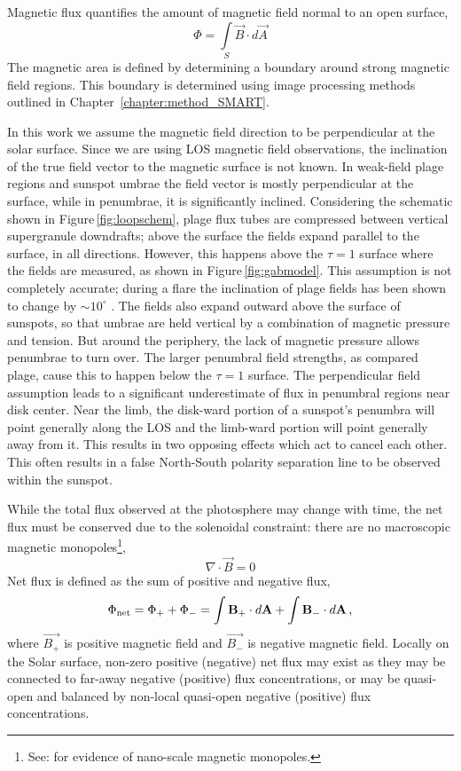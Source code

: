 Magnetic flux quantifies the amount of magnetic field normal to an open surface,
\begin{equation}
\Phi = \int\limits_S \vec{B} \cdot d\vec{A}  
\end{equation}
The magnetic area is defined by determining a boundary around strong magnetic field regions. This boundary is determined using image processing methods outlined in Chapter~\ref{chapter:method_SMART}.

In this work we assume the magnetic field direction to be perpendicular at the solar surface. Since we are using \gls{LOS} magnetic field observations, the inclination of the true field vector to the magnetic surface is not known. In weak-field plage regions and sunspot umbrae the field vector is mostly perpendicular at the surface, while in penumbrae, it is significantly inclined. Considering the schematic shown in Figure\,\ref{fig:loopschem}, plage flux tubes are compressed between vertical supergranule downdrafts; above the surface the fields expand parallel to the surface, in all directions. However, this happens above the $\tau=1$ surface where the fields are measured, as shown in Figure\,\ref{fig:gabmodel}. This assumption is not completely accurate; during a flare the inclination of plage fields has been shown to change by $\sim$$10^{\circ}$ \citep{Murray:2012}. The fields also expand outward above the surface of sunspots, so that umbrae are held vertical by a combination of magnetic pressure and tension. But around the periphery, the lack of magnetic pressure allows penumbrae to turn over. The larger penumbral field strengths, as compared plage, cause this to happen below the $\tau=1$ surface. The perpendicular field assumption leads to a significant underestimate of flux in penumbral regions near disk center. Near the limb,  the disk-ward portion of a sunspot's penumbra will point generally along the LOS and the limb-ward portion will point generally away from it. This results in two opposing effects which act to cancel each other. This often results in a false North-South polarity separation line to be observed within the sunspot.

While the total flux observed at the photosphere may change with time, the net flux must be conserved due to the solenoidal constraint: there are no macroscopic magnetic monopoles\footnote{See: \citet{Mengotti:2010} for evidence of nano-scale magnetic monopoles.},
\begin{equation}\label{eqn_gauss_law}
\nabla\cdot\vec{B}=0  
\end{equation}
Net flux is defined as the sum of positive and negative flux,
\begin{equation}
\Phi_{\mathrm{net}}=\Phi_{+}+\Phi_{-}=\int{\vec{B_{+}}\cdot d\vec{A}} + \int{\vec{B_{-}}\cdot d\vec{A}} \mbox{\,,}
\end{equation}
where $\vec{B_{+}}$ is positive magnetic field and $\vec{B_{-}}$ is negative magnetic field. Locally on the Solar surface, non-zero positive (negative) net flux may exist as they may be connected to far-away negative (positive) flux concentrations, or may be quasi-open and balanced by non-local quasi-open negative (positive) flux concentrations.

